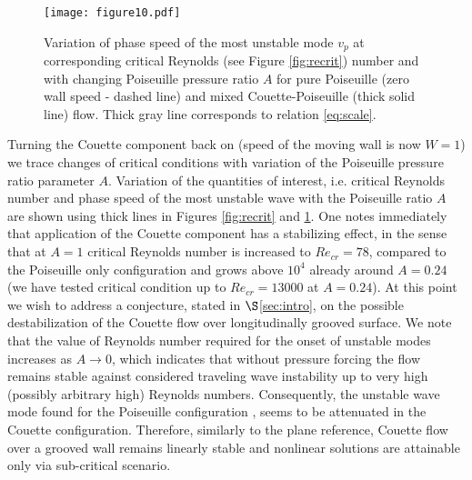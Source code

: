 \documentclass[lineno]{jfm}
\begin{document}
\begin{figure}
\centering
	\texttt{[image: figure10.pdf]}  
	\caption{Variation of phase speed  of the most unstable mode $v_{p}$ at corresponding critical Reynolds (see Figure \ref{fig:recrit}) number and with changing Poiseuille pressure ratio $A$ for pure Poiseuille (zero wall speed - dashed line) and mixed Couette-Poiseuille (thick solid line) flow. Thick gray line corresponds to  relation  \eqref{eq:scale}.
	}
	\label{fig:phasevel}
\end{figure}

Turning the Couette component back on (speed of the moving wall is now $W=1$) we trace changes of critical conditions with variation of the Poiseuille pressure ratio parameter $A$.
Variation of the quantities of interest, i.e. critical Reynolds number and phase speed of the most unstable wave with the Poiseuille ratio $A$ are shown using thick lines in Figures \ref{fig:recrit} and \ref{fig:phasevel}.
One notes immediately that application of the Couette component has a stabilizing effect, in the sense that at $A=1$ critical Reynolds number is increased to $Re_{cr}=78$, compared to the Poiseuille only configuration and grows above $10^4$ already around $A=0.24$ (we have tested critical condition up to $Re_{cr}=13000$ at $A=0.24$).
At this point we wish to address a conjecture, stated in $\S$\ref{sec:intro}, on the possible destabilization of the Couette flow over longitudinally grooved surface.
We note that the value of Reynolds number required for the onset of unstable modes increases as $A\to0$, which indicates that without pressure forcing the flow remains stable against considered traveling wave instability up to very high (possibly arbitrary high) Reynolds numbers.
Consequently, the unstable wave mode found for the Poiseuille configuration \citep{Nikesh2017}, seems to be attenuated in the Couette configuration.
Therefore, similarly to the plane reference, Couette flow over a grooved wall remains linearly stable and nonlinear solutions are attainable only via sub-critical scenario.
\end{document}
